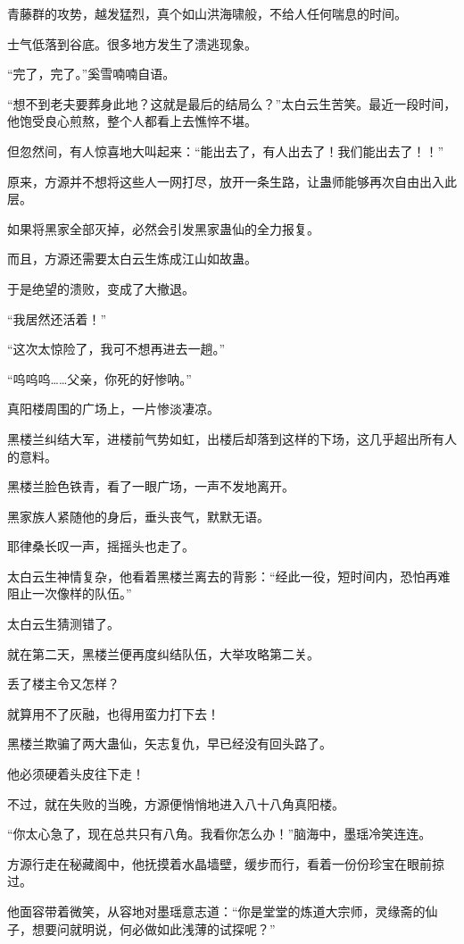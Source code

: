 \begin{this_body}
青藤群的攻势，越发猛烈，真个如山洪海啸般，不给人任何喘息的时间。

士气低落到谷底。很多地方发生了溃逃现象。

“完了，完了。”奚雪喃喃自语。

“想不到老夫要葬身此地？这就是最后的结局么？”太白云生苦笑。最近一段时间，他饱受良心煎熬，整个人都看上去憔悴不堪。

但忽然间，有人惊喜地大叫起来：“能出去了，有人出去了！我们能出去了！！”

原来，方源并不想将这些人一网打尽，放开一条生路，让蛊师能够再次自由出入此层。

如果将黑家全部灭掉，必然会引发黑家蛊仙的全力报复。

而且，方源还需要太白云生炼成江山如故蛊。

于是绝望的溃败，变成了大撤退。

“我居然还活着！”

“这次太惊险了，我可不想再进去一趟。”

“呜呜呜……父亲，你死的好惨呐。”

真阳楼周围的广场上，一片惨淡凄凉。

黑楼兰纠结大军，进楼前气势如虹，出楼后却落到这样的下场，这几乎超出所有人的意料。

黑楼兰脸色铁青，看了一眼广场，一声不发地离开。

黑家族人紧随他的身后，垂头丧气，默默无语。

耶律桑长叹一声，摇摇头也走了。

太白云生神情复杂，他看着黑楼兰离去的背影：“经此一役，短时间内，恐怕再难阻止一次像样的队伍。”

太白云生猜测错了。

就在第二天，黑楼兰便再度纠结队伍，大举攻略第二关。

丢了楼主令又怎样？

就算用不了灰融，也得用蛮力打下去！

黑楼兰欺骗了两大蛊仙，矢志复仇，早已经没有回头路了。

他必须硬着头皮往下走！

不过，就在失败的当晚，方源便悄悄地进入八十八角真阳楼。

“你太心急了，现在总共只有八角。我看你怎么办！”脑海中，墨瑶冷笑连连。

方源行走在秘藏阁中，他抚摸着水晶墙壁，缓步而行，看着一份份珍宝在眼前掠过。

他面容带着微笑，从容地对墨瑶意志道：“你是堂堂的炼道大宗师，灵缘斋的仙子，想要问就明说，何必做如此浅薄的试探呢？”


\end{this_body}
